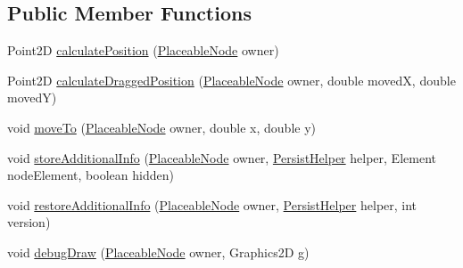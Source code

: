 \subsection*{Public Member Functions}
\begin{DoxyCompactItemize}
\item 
Point2\-D \hyperlink{classorg_1_1tzi_1_1use_1_1gui_1_1views_1_1diagrams_1_1elements_1_1positioning_1_1_strategy_fixed_af3f147d9fad17f3b38c5d3aa0a54854c}{calculate\-Position} (\hyperlink{classorg_1_1tzi_1_1use_1_1gui_1_1views_1_1diagrams_1_1elements_1_1_placeable_node}{Placeable\-Node} owner)
\item 
Point2\-D \hyperlink{classorg_1_1tzi_1_1use_1_1gui_1_1views_1_1diagrams_1_1elements_1_1positioning_1_1_strategy_fixed_ab9fbe2b586ce319ffb80a63b359904f5}{calculate\-Dragged\-Position} (\hyperlink{classorg_1_1tzi_1_1use_1_1gui_1_1views_1_1diagrams_1_1elements_1_1_placeable_node}{Placeable\-Node} owner, double moved\-X, double moved\-Y)
\item 
void \hyperlink{classorg_1_1tzi_1_1use_1_1gui_1_1views_1_1diagrams_1_1elements_1_1positioning_1_1_strategy_fixed_a3ba666fb1cd7124b23038033513ef560}{move\-To} (\hyperlink{classorg_1_1tzi_1_1use_1_1gui_1_1views_1_1diagrams_1_1elements_1_1_placeable_node}{Placeable\-Node} owner, double x, double y)
\item 
void \hyperlink{classorg_1_1tzi_1_1use_1_1gui_1_1views_1_1diagrams_1_1elements_1_1positioning_1_1_strategy_fixed_aadbed3950fe334643c8ab48301aaa437}{store\-Additional\-Info} (\hyperlink{classorg_1_1tzi_1_1use_1_1gui_1_1views_1_1diagrams_1_1elements_1_1_placeable_node}{Placeable\-Node} owner, \hyperlink{classorg_1_1tzi_1_1use_1_1gui_1_1util_1_1_persist_helper}{Persist\-Helper} helper, Element node\-Element, boolean hidden)
\item 
void \hyperlink{classorg_1_1tzi_1_1use_1_1gui_1_1views_1_1diagrams_1_1elements_1_1positioning_1_1_strategy_fixed_a78aaec896b0e737ec35b919ac273f806}{restore\-Additional\-Info} (\hyperlink{classorg_1_1tzi_1_1use_1_1gui_1_1views_1_1diagrams_1_1elements_1_1_placeable_node}{Placeable\-Node} owner, \hyperlink{classorg_1_1tzi_1_1use_1_1gui_1_1util_1_1_persist_helper}{Persist\-Helper} helper, int version)
\item 
void \hyperlink{classorg_1_1tzi_1_1use_1_1gui_1_1views_1_1diagrams_1_1elements_1_1positioning_1_1_strategy_fixed_ae73729ed5923dd51604fb327d8043884}{debug\-Draw} (\hyperlink{classorg_1_1tzi_1_1use_1_1gui_1_1views_1_1diagrams_1_1elements_1_1_placeable_node}{Placeable\-Node} owner, Graphics2\-D g)
\item 

\end{DoxyCompactItemize}
